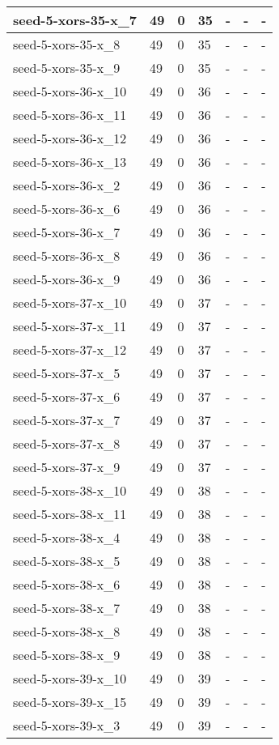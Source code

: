 \begin{scriptsize}
\begin{longtable}{|p{5cm}|l|l|l|l|l|l|}
seed-5-xors-35-x\_7&49&0&35&-&-&- \\ \hline 
seed-5-xors-35-x\_8&49&0&35&-&-&- \\ \hline 
seed-5-xors-35-x\_9&49&0&35&-&-&- \\ \hline 
seed-5-xors-36-x\_10&49&0&36&-&-&- \\ \hline 
seed-5-xors-36-x\_11&49&0&36&-&-&- \\ \hline 
seed-5-xors-36-x\_12&49&0&36&-&-&- \\ \hline 
seed-5-xors-36-x\_13&49&0&36&-&-&- \\ \hline 
seed-5-xors-36-x\_2&49&0&36&-&-&- \\ \hline 
seed-5-xors-36-x\_6&49&0&36&-&-&- \\ \hline 
seed-5-xors-36-x\_7&49&0&36&-&-&- \\ \hline 
seed-5-xors-36-x\_8&49&0&36&-&-&- \\ \hline 
seed-5-xors-36-x\_9&49&0&36&-&-&- \\ \hline 
seed-5-xors-37-x\_10&49&0&37&-&-&- \\ \hline 
seed-5-xors-37-x\_11&49&0&37&-&-&- \\ \hline 
seed-5-xors-37-x\_12&49&0&37&-&-&- \\ \hline 
seed-5-xors-37-x\_5&49&0&37&-&-&- \\ \hline 
seed-5-xors-37-x\_6&49&0&37&-&-&- \\ \hline 
seed-5-xors-37-x\_7&49&0&37&-&-&- \\ \hline 
seed-5-xors-37-x\_8&49&0&37&-&-&- \\ \hline 
seed-5-xors-37-x\_9&49&0&37&-&-&- \\ \hline 
seed-5-xors-38-x\_10&49&0&38&-&-&- \\ \hline 
seed-5-xors-38-x\_11&49&0&38&-&-&- \\ \hline 
seed-5-xors-38-x\_4&49&0&38&-&-&- \\ \hline 
seed-5-xors-38-x\_5&49&0&38&-&-&- \\ \hline 
seed-5-xors-38-x\_6&49&0&38&-&-&- \\ \hline 
seed-5-xors-38-x\_7&49&0&38&-&-&- \\ \hline 
seed-5-xors-38-x\_8&49&0&38&-&-&- \\ \hline 
seed-5-xors-38-x\_9&49&0&38&-&-&- \\ \hline 
seed-5-xors-39-x\_10&49&0&39&-&-&- \\ \hline 
seed-5-xors-39-x\_15&49&0&39&-&-&- \\ \hline 
seed-5-xors-39-x\_3&49&0&39&-&-&- \\ \hline 

\end{longtable}
\end{scriptsize}
